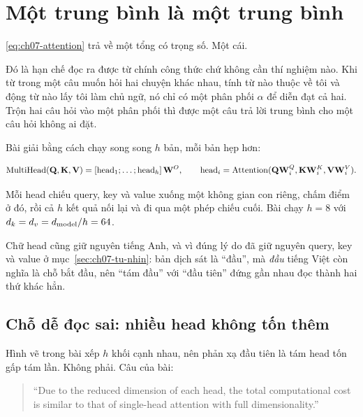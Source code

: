 \section{Một trung bình là một trung bình}
\label{sec:ch07-nhieu-dau}

%
\eqref{eq:ch07-attention} trả về một tổng có trọng số. Một cái.

Đó là hạn chế đọc ra được từ chính công thức chứ không cần thí nghiệm nào. Khi
từ  trong một câu muốn hỏi hai chuyện khác nhau, tính từ nào thuộc về
tôi và động từ nào lấy tôi làm chủ ngữ, nó chỉ có một phân phối \(\alpha\) để
diễn đạt cả hai. Trộn hai câu hỏi vào một phân phối thì được một câu trả lời
trung bình cho một câu hỏi không ai đặt.

Bài giải bằng cách chạy song song \(h\) bản, mỗi bản hẹp hơn:

\begin{equation}
  \operatorname{MultiHead}(\mathbf{Q}, \mathbf{K}, \mathbf{V})
  = \left[\operatorname{head}_1; \dots; \operatorname{head}_h\right] \mathbf{W}^O,
  \qquad
  \operatorname{head}_i = \operatorname{Attention}(\mathbf{Q}\mathbf{W}^Q_i, \mathbf{K}\mathbf{W}^K_i,
                         \mathbf{V}\mathbf{W}^V_i).
  \label{eq:ch07-multihead}
\end{equation}

Mỗi head chiếu query, key và value xuống một không gian con riêng, chấm điểm ở
đó, rồi cả \(h\) kết quả nối lại và đi qua một phép chiếu cuối. Bài chạy
\(h = 8\) với \(d_{k} = d_{v} = d_{\mathrm{model}}/h = 64\).

Chữ head cũng giữ nguyên tiếng Anh, và vì đúng lý do đã giữ nguyên query, key và
value ở mục~\ref{sec:ch07-tu-nhin}: bản dịch sát là \enquote{đầu}, mà \emph{đầu}
tiếng Việt còn nghĩa là chỗ bắt đầu, nên \enquote{tám đầu} với \enquote{đầu
tiên} đứng gần nhau đọc thành hai thứ khác hẳn.

\subsection*{Chỗ dễ đọc sai: nhiều head không tốn thêm}

%
Hình vẽ trong bài xếp \(h\) khối cạnh nhau, nên phản xạ đầu tiên là tám head
tốn gấp tám lần. Không phải. Câu của bài:

\begin{quote}
\enquote{Due to the reduced dimension of each head, the total computational
cost is similar to that of single-head attention with full dimensionality.}
\end{quote}

